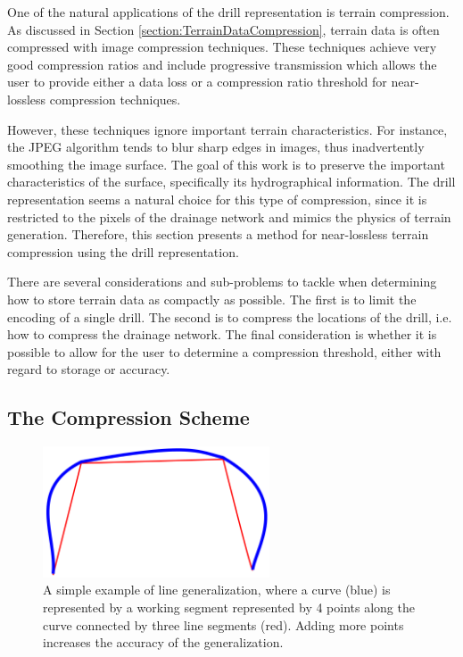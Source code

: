 One of the natural applications of the drill representation is terrain compression. 
As discussed in Section \ref{section:TerrainDataCompression}, terrain data is often compressed with image compression techniques. These techniques achieve very good compression ratios and include progressive transmission which allows the user to provide either a data loss or a compression ratio threshold for near-lossless compression techniques.

However, these techniques ignore important terrain characteristics. For instance, the JPEG algorithm tends to blur sharp edges in images, thus inadvertently smoothing the image surface. The goal of this work is to preserve the important characteristics of the surface, specifically its hydrographical information. The drill representation seems a natural choice for this type of compression, since it is restricted to the pixels of the drainage network and mimics the physics of terrain generation. Therefore, this section presents a method for near-lossless terrain compression using the drill representation.

There are several considerations and sub-problems to tackle when determining how to store terrain data as compactly as possible. The first is to limit the encoding of a single drill. The second is to compress the locations of the drill, i.e. how to compress the drainage network. The final consideration is whether it is possible to allow for the user to determine a compression threshold, either with regard to storage or accuracy.

\subsection{The Compression Scheme}
\label{section:CompressionScheme}

\begin{figure}[t]
  \centering
  \includegraphics[width=0.6\textwidth]{images/LineGeneralization_cropped.png}
  \caption[A simple example of line generalization.]{\label{figure:LineGeneralization}A simple example of line generalization, where a curve (blue) is represented by a working segment represented by 4 points along the curve connected by three line segments (red). Adding more points increases the accuracy of the generalization.}
\end{figure}


